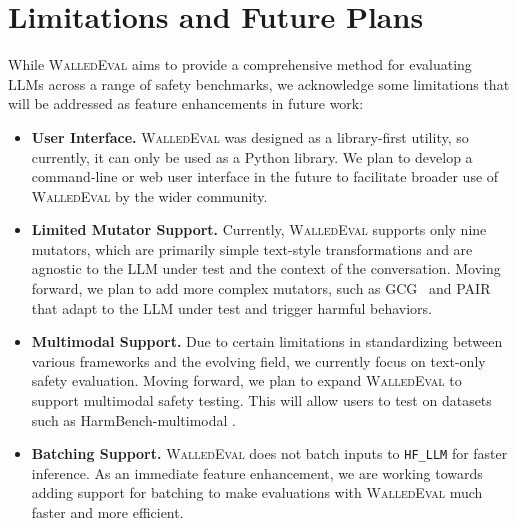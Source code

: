 \documentclass[11pt]{article}
\newcommand{\tool}{\textsc{WalledEval}}
\newcommand{\llmcls}{{\color{purple} \texttt{HF\_LLM}}}
\begin{document}
\section{Limitations and Future Plans}

While \tool{} aims to provide a comprehensive method for evaluating LLMs across a range of safety benchmarks, we acknowledge some limitations that will be addressed as feature enhancements in future work:

\begin{itemize}[left=1pt, labelsep=-1pt, label={\textbullet\hspace{0.1cm}}]
    \item \textbf{User Interface.} \tool{} was designed as a library-first utility, so currently, it can only be used as a Python library. We plan to develop a command-line or web user interface in the future to facilitate broader use of \tool{} by the wider community.
    
    \item \textbf{Limited Mutator Support.} Currently, \tool{} supports only nine mutators, which are primarily simple text-style transformations and are agnostic to the LLM under test and the context of the conversation. Moving forward, we plan to add more complex mutators, such as GCG~\cite{zou2023universal} and PAIR~\cite{chao2023jailbreaking} that adapt to the LLM under test and trigger harmful behaviors.

    \item \textbf{Multimodal Support.} Due to certain limitations in standardizing between various frameworks and the evolving field, we currently focus on text-only safety evaluation. Moving forward, we plan to expand \tool{} to support multimodal safety testing. This will allow users to test on datasets such as HarmBench-multimodal \cite{mazeika2024harmbench}.
    

    \item \textbf{Batching Support.} \tool{} does not batch inputs to \llmcls{} for faster inference. As an immediate feature enhancement, we are working towards adding support for batching to make evaluations with \tool{} much faster and more efficient.


\end{itemize}
\end{document}
